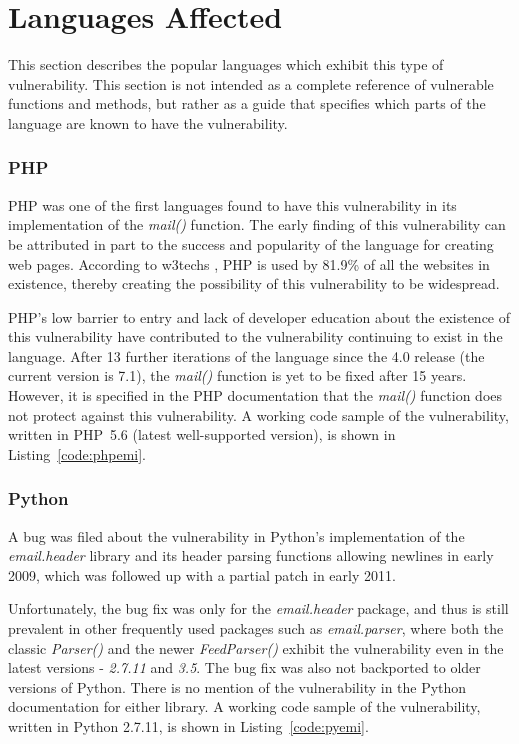\section{Languages Affected}

This section describes the popular languages which exhibit this type of vulnerability. This section is not intended as a complete reference of vulnerable functions and methods, but rather as a guide that specifies which parts of the language are known to have the vulnerability.

\subsubsection{PHP} 
PHP was one of the first languages found to have this vulnerability in its implementation of the \emph{mail()} function. The early finding of this vulnerability can be attributed in part to the success and popularity of the language for creating web pages. According to w3techs \cite{W3techs}, PHP is used by 81.9\% of all the websites in existence, thereby creating the possibility of this vulnerability to be widespread. 

PHP's low barrier to entry and lack of developer education about the existence of this vulnerability have contributed to the vulnerability continuing to exist in the language.
After 13 further iterations of the language since the 4.0 release (the current version is 7.1), the \emph{mail()} function is yet to be fixed after 15 years. However, it is specified in the PHP documentation \cite{PHPDocs} that the \emph{mail()} function does not protect against this vulnerability.
A working code sample of the vulnerability, written in PHP~5.6 (latest well-supported version), is shown in  Listing~\ref{code:phpemi}.


\subsubsection{Python} 
A bug was filed about the vulnerability in Python's implementation of the \emph{email.header} library and its header parsing functions allowing newlines in early 2009, which was followed up with a partial patch in early 2011. 

Unfortunately, the bug fix was only for the \emph{email.header} package, and thus is still prevalent in other frequently used packages such as \emph{email.parser}, where both the classic \emph{Parser()} and the newer \emph{FeedParser()} exhibit the vulnerability even in the latest versions - \emph{2.7.11} and \emph{3.5}. The bug fix was also not backported to older versions of Python. 
There is no mention of the vulnerability in the Python documentation for either library.
A working code sample of the vulnerability, written in Python 2.7.11, is shown in Listing~\ref{code:pyemi}.


